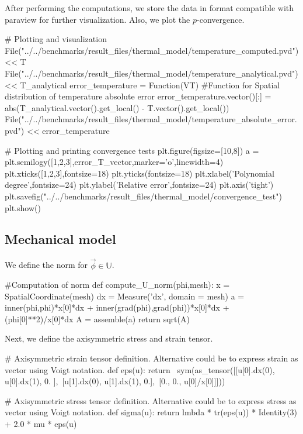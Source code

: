 After performing the computations, we store the data in format compatible with paraview for further visualization. Also, we plot the $p$-convergence.
\begin{python}
# Plotting and visualization
File("../../benchmarks/result_files/thermal_model/temperature_computed.pvd") << T
File("../../benchmarks/result_files/thermal_model/temperature_analytical.pvd") << T_analytical
error_temperature = Function(VT) #Function for Spatial distribution of temperature absolute error
error_temperature.vector()[:] = abs(T_analytical.vector().get_local() - T.vector().get_local())
File("../../benchmarks/result_files/thermal_model/temperature_absolute_error.pvd") << error_temperature

# Plotting and printing convergence tests
plt.figure(figsize=[10,8])
a = plt.semilogy([1,2,3],error_T_vector,marker='o',linewidth=4)
plt.xticks([1,2,3],fontsize=18)
plt.yticks(fontsize=18)
plt.xlabel('Polynomial degree',fontsize=24)
plt.ylabel('Relative error',fontsize=24)
plt.axis('tight')
plt.savefig("../../benchmarks/result_files/thermal_model/convergence_test")
plt.show()
\end{python}

\subsection{Mechanical model}\label{mechanical_model}

We define the norm for $\overrightarrow{\phi} \in \mathbb{U}$.
\begin{python}
#Computation of  norm
def compute_U_norm(phi,mesh):
	x = SpatialCoordinate(mesh)
	dx = Measure('dx', domain = mesh)
	a = inner(phi,phi)*x[0]*dx + inner(grad(phi),grad(phi))*x[0]*dx + (phi[0]**2)/x[0]*dx
	A = assemble(a)
	return sqrt(A)
\end{python}

Next, we define the axisymmetric stress and strain tensor.
\begin{python}
# Axisymmetric strain tensor definition. Alternative could be to express strain as vector using Voigt notation.
def eps(u): 
	return \
		sym(as_tensor([[u[0].dx(0), u[0].dx(1), 0. ],\
		[u[1].dx(0), u[1].dx(1), 0.],\
		[0., 0., u[0]/x[0]]]))

# Axisymmetric stress tensor definition. Alternative could be to express stress as vector using Voigt notation.
def sigma(u):
	return lmbda * tr(eps(u)) * Identity(3) + 2.0 * mu * eps(u)
\end{python}

